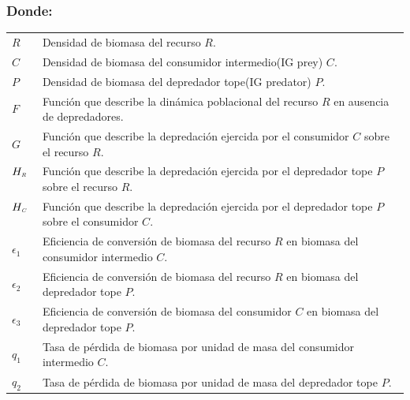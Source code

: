 \subsubsection*{Donde:}
\begin{longtable}{l@{: }p{5.8in}}
$R$\ &   Densidad de biomasa del recurso $R$.\\
$C$\ &  Densidad de biomasa del consumidor intermedio(IG prey) $C$.\\
$P$\ &  Densidad de biomasa del depredador tope(IG predator) $P$.\\
$F$\ &  Funci\'on que describe la din\'amica poblacional del recurso $R$ en ausencia de depredadores.\\
$G$\ &  Funci\'on que describe la depredaci\'on ejercida por el consumidor $C$ sobre el recurso $R$.\\
$H_{\textit{\tiny R}}$\ &  Funci\'on que describe la depredaci\'on ejercida por el depredador tope $P$ sobre el recurso $R$.\\
$H_{\textit{\tiny C}}$\ &  Funci\'on que describe la depredaci\'on ejercida por el depredador tope $P$ sobre el consumidor $C$.\\
$\epsilon_1$\ &  Eficiencia de conversi\'on de biomasa del recurso $R$ en biomasa del consumidor intermedio $C$.\\
$\epsilon_2$\ &  Eficiencia de conversi\'on de biomasa del recurso $R$ en biomasa del depredador tope $P$.\\
$\epsilon_3$\ &  Eficiencia de conversi\'on de biomasa del consumidor $C$ en biomasa del depredador tope $P$.\\
$q_1$\ &  Tasa de p\'erdida de biomasa por unidad de masa del consumidor intermedio $C$.\\
$q_2$\ &  Tasa de p\'erdida de biomasa por unidad de masa del depredador tope $P$.\\
\end{longtable}
